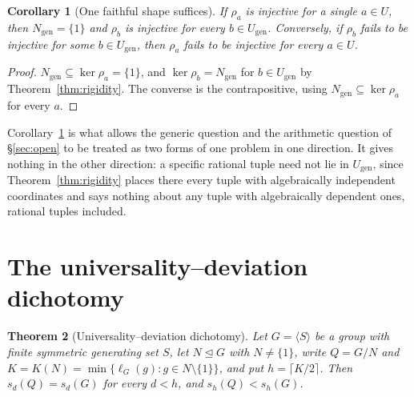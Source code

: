 \documentclass[11pt,a4paper]{article}
\newtheorem{theorem}{Theorem}
\newtheorem{corollary}[theorem]{Corollary}
\theoremstyle{definition}
\theoremstyle{remark}
\theoremstyle{plain}
\begin{document}
\begin{corollary}[One faithful shape suffices]\label{cor:one-shape}
If $\rho_a$ is injective for a single $a\in U$, then $N_{\mathrm{gen}}=\{1\}$ and $\rho_b$ is
injective for every $b\in U_{\mathrm{gen}}$. Conversely, if $\rho_b$ fails to be injective for
some $b\in U_{\mathrm{gen}}$, then $\rho_a$ fails to be injective for every $a\in U$.
\end{corollary}

\begin{proof}
$N_{\mathrm{gen}}\subseteq\ker\rho_a=\{1\}$, and $\ker\rho_b=N_{\mathrm{gen}}$ for
$b\in U_{\mathrm{gen}}$ by Theorem~\ref{thm:rigidity}. The converse is the contrapositive,
using $N_{\mathrm{gen}}\subseteq\ker\rho_a$ for every $a$.
\end{proof}

Corollary~\ref{cor:one-shape} is what allows the generic question and the arithmetic question of
\S\ref{sec:open} to be treated as two forms of one problem in one direction. It gives nothing in
the other direction: a specific rational tuple need not lie in $U_{\mathrm{gen}}$, since
Theorem~\ref{thm:rigidity} places there every tuple with algebraically independent coordinates and
says nothing about any tuple with algebraically dependent ones, rational tuples included.

\section{The universality--deviation dichotomy}\label{sec:dichotomy}

\begin{theorem}[Universality--deviation dichotomy]\label{thm:dichotomy}
Let $G=\langle S\rangle$ be a group with finite symmetric generating set $S$, let
$N\trianglelefteq G$ with $N\ne\{1\}$, write $Q=G/N$ and
$K=K(N)=\min\{\ell_G(g):g\in N\setminus\{1\}\}$, and put $h=\lceil K/2\rceil$. Then
$s_d(Q)=s_d(G)$ for every $d<h$, and $s_h(Q)<s_h(G)$.
\end{theorem}
\end{document}
